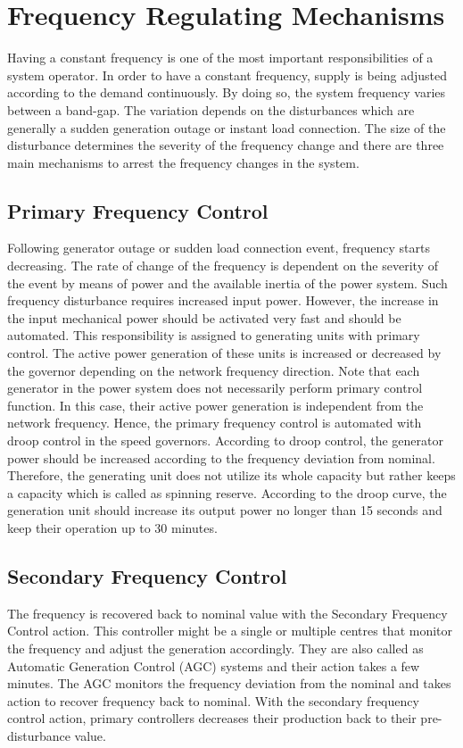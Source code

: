 \section{Frequency Regulating Mechanisms}
Having a constant frequency is one of the most important responsibilities of a system operator. In order to have a constant frequency, supply is being adjusted according to the demand continuously. By doing so, the system frequency varies between a band-gap. The variation depends on the disturbances which are generally a sudden generation outage or instant load connection. The size of the disturbance determines the severity of the frequency change and there are three main mechanisms to arrest the frequency changes in the system. 
\subsection{Primary Frequency Control}
Following generator outage or sudden load connection event, frequency starts decreasing. The rate of change of the frequency is dependent on the severity of the event by means of power and the available inertia of the power system. Such frequency disturbance requires increased input power. However, the increase in the input mechanical power should be activated very fast and should be automated. This responsibility is assigned to generating units with primary control. The active power generation of these units is increased or decreased by the governor depending on the network frequency direction. Note that each generator in the power system does not necessarily perform primary control function. In this case, their active power generation is independent from the network frequency.
Hence, the primary frequency control is automated with droop control in the speed governors. According to droop control, the generator power should be increased according to the frequency deviation from nominal. Therefore, the generating unit does not utilize its whole capacity but rather keeps a capacity which is called as spinning reserve. According to the droop curve, the generation unit should increase its output power no longer than 15 seconds and keep their operation up to 30 minutes\cite{Machowski2011}.
\subsection{Secondary Frequency Control}
The frequency is recovered back to nominal value with the Secondary Frequency Control action. This controller might be a single or multiple centres that monitor the frequency and adjust the generation accordingly. They are also called as Automatic Generation Control (AGC) systems and their action takes a few minutes. The AGC monitors the frequency deviation from the nominal and takes action to recover frequency back to nominal. With the secondary frequency control action, primary controllers decreases their production back to their pre-disturbance value.
